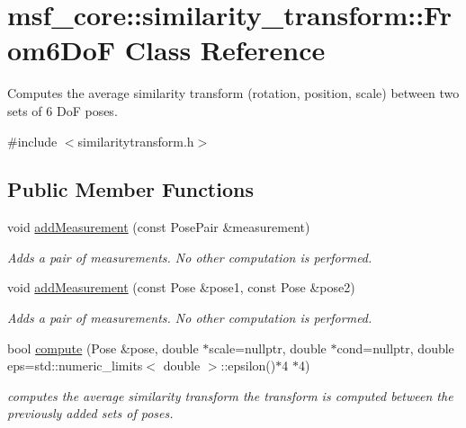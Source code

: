 \hypertarget{classmsf__core_1_1similarity__transform_1_1From6DoF}{\section{msf\-\_\-core\-:\-:similarity\-\_\-transform\-:\-:From6\-Do\-F Class Reference}
\label{classmsf__core_1_1similarity__transform_1_1From6DoF}
}


Computes the average similarity transform (rotation, position, scale) between two sets of 6 Do\-F poses.  




{\ttfamily \#include $<$similaritytransform.\-h$>$}

\subsection*{Public Member Functions}
\begin{DoxyCompactItemize}
\item 
\hypertarget{classmsf__core_1_1similarity__transform_1_1From6DoF_a842474c8de6308fd9805f96eb8069954}{void \hyperlink{classmsf__core_1_1similarity__transform_1_1From6DoF_a842474c8de6308fd9805f96eb8069954}{add\-Measurement} (const Pose\-Pair \&measurement)}\label{classmsf__core_1_1similarity__transform_1_1From6DoF_a842474c8de6308fd9805f96eb8069954}

\begin{DoxyCompactList}\small\item\em Adds a pair of measurements. No other computation is performed. \end{DoxyCompactList}\item 
\hypertarget{classmsf__core_1_1similarity__transform_1_1From6DoF_ac03ed87bcf4b8a7dc9aefb0ec22f5f17}{void \hyperlink{classmsf__core_1_1similarity__transform_1_1From6DoF_ac03ed87bcf4b8a7dc9aefb0ec22f5f17}{add\-Measurement} (const Pose \&pose1, const Pose \&pose2)}\label{classmsf__core_1_1similarity__transform_1_1From6DoF_ac03ed87bcf4b8a7dc9aefb0ec22f5f17}

\begin{DoxyCompactList}\small\item\em Adds a pair of measurements. No other computation is performed. \end{DoxyCompactList}\item 
bool \hyperlink{classmsf__core_1_1similarity__transform_1_1From6DoF_ae5e680668d31c2b4522bbf1a3aafdfb1}{compute} (Pose \&pose, double $\ast$scale=nullptr, double $\ast$cond=nullptr, double eps=std\-::numeric\-\_\-limits$<$ double $>$\-::epsilon()$\ast$4 $\ast$4)
\begin{DoxyCompactList}\small\item\em computes the average similarity transform the transform is computed between the previously added sets of poses. \end{DoxyCompactList}\end{DoxyCompactItemize}


